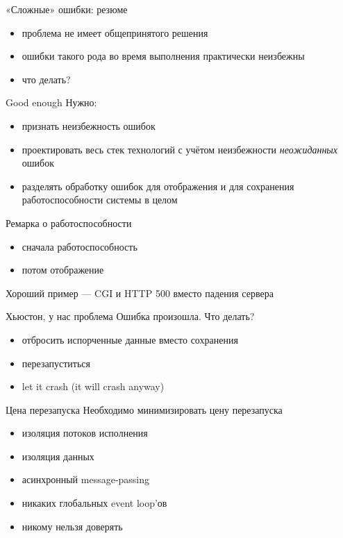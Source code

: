\documentclass[10pt]{beamer}
\begin{document}
\begin{frame}{«Сложные» ошибки: резюме}
  \begin{itemize}
  \item проблема не имеет общепринятого решения
  \item ошибки такого рода во время выполнения практически неизбежны
  \item что делать?
  \end{itemize}
\end{frame}

\begin{frame}{Good enough}
  Нужно:
  \begin{itemize}
  \item признать неизбежность ошибок
  \item проектировать весь стек технологий с учётом неизбежности \emph{неожиданных} ошибок
  \item разделять обработку ошибок для отображения и для сохранения работоспособности системы в целом
  \end{itemize}
\end{frame}

\begin{frame}{Ремарка о работоспособности}
  \begin{itemize}
  \item сначала работоспособность
  \item потом отображение
  \end{itemize}
  Хороший пример — CGI и HTTP 500 вместо падения сервера
\end{frame}

\begin{frame}{Хьюстон, у нас проблема}
  Ошибка произошла. Что делать?
  \begin{itemize}
  \item отбросить испорченные данные вместо сохранения
  \item перезапуститься
  \item let it crash (it will crash anyway)
  \end{itemize}
\end{frame}

\begin{frame}{Цена перезапуска}
  Необходимо минимизировать цену перезапуска
  \begin{itemize}
  \item изоляция потоков исполнения
  \item изоляция данных
  \item асинхронный message-passing
  \item никаких глобальных event loop'ов
  \item никому нельзя доверять
  \end{itemize}
\end{frame}
\end{document}
